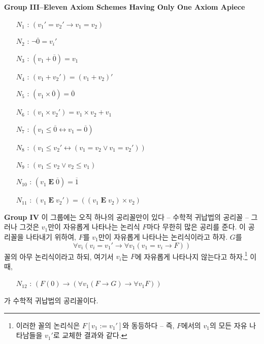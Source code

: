 \documentclass[12pt]{paper}
\begin{document}
  \noindent \textbf{Group III--Eleven Axiom Schemes Having Only One Axiom Apiece}
  \begin{enumerate}
    \item[$N_{1}$ :] $\left( v_1 ' = v_2 ' \rightarrow v_1 = v_2 \right)$
    \item[$N_{2}$ :] $\lnot \overline{0} = v_i '$
    \item[$N_{3}$ :] $\left( v_1 + \overline{0} \right) = v_1$
    \item[$N_{4}$ :] $\left( v_1 + v_2 ' \right) = \left( v_1 + v_2 \right) '$
    \item[$N_{5}$ :] $\left( v_1 \times \overline{0} \right) = \overline{0}$
    \item[$N_{6}$ :] $\left( v_1 \times v_2 ' \right) = v_1 \times v_2 + v_1$
    \item[$N_{7}$ :] $\left( v_1 \leq \overline{0} \leftrightarrow v_1 = \overline{0} \right)$
    \item[$N_{8}$ :] $\left( v_1 \leq v_2 ' \leftrightarrow \left( v_1 = v_2 \lor v_1 = v_2 ' \right) \right)$
    \item[$N_{9}$ :] $\left( v_1 \leq v_2 \lor v_2 \leq v_1 \right)$
    \item[$N_{10}$ :] $\left( v_1 \mathop{\mathbf{E}} \overline{0} \right) = \overline{1}$
    \item[$N_{11}$ :] $\left( v_1 \mathop{\mathbf{E}} v_2 ' \right) = \left( \left( v_1 \mathop{\mathbf{E}} v_2 \right) \times v_2 \right)$ 
  \end{enumerate}

  \noindent \textbf{Group IV}
  이 그룹에는 오직 하나의 공리꼴만이 있다 -- 수학적 귀납법의 공리꼴 --
  그러나 그것은 $v_1$만이 자유롭게 나타나는 논리식 $F$마다 무한히 많은 공리를 준다.
  이 공리꼴을 나타내기 위하여, $F$를 $v_1$만이 자유롭게 나타나는 논리식이라고 하자.
  $G$를 $$\forall v_i \left( v_i = v_1 ' \rightarrow \forall v_1 \left( v_1 = v_i \rightarrow F \right) \right)$$ 꼴의 아무 논리식이라고 하되,
  여기서 $v_i$는 $F$에 자유롭게 나타나지 않는다고 하자.\footnote
  {
    이러한 꼴의 논리식은 $F \left[ v_1 := v_1 ' \right]$와 동등하다 -- 즉, $F$에서의 $v_1$의 모든 자유 나타남들을 $v_1 '$로 교체한 결과와 같다.
  }
  이때,
  \begin{enumerate}
    \item[$N_{12}$ :] $\left( F \left( 0 \right) \rightarrow \left( \forall v_1 \left( F \rightarrow G \right) \rightarrow \forall v_1 F \right) \right)$
  \end{enumerate}
  가 수학적 귀납법의 공리꼴이다.
\end{document}
